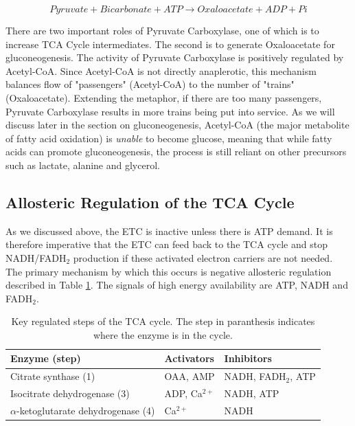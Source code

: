 \documentclass{tufte-handout}
\begin{document}
\begin{equation}\label{eq:pcx}
Pyruvate + Bicarbonate + ATP \rightarrow Oxaloacetate + ADP + Pi
\end{equation}

There are two important roles of Pyruvate Carboxylase, one of which is to increase TCA Cycle intermediates.  The second is to generate Oxaloacetate for gluconeogenesis.  The activity of Pyruvate Carboxylase is positively regulated by Acetyl-CoA.  Since Acetyl-CoA is not directly anaplerotic, this mechanism balances flow of "passengers" (Acetyl-CoA) to the number of "trains" (Oxaloacetate).  Extending the metaphor, if there are too many passengers, Pyruvate Carboxylase results in more trains being put into service.  As we will discuss later in the section on gluconeogenesis, Acetyl-CoA (the major metabolite of fatty acid oxidation) is \emph{unable} to become glucose, meaning that while fatty acids can promote gluconeogenesis, the process is still reliant on other precursors such as lactate, alanine and glycerol.

\subsection{Allosteric Regulation of the TCA Cycle}

As we discussed above, the ETC is inactive unless there is ATP demand.  It is therefore imperative that the ETC can feed back to the TCA cycle and stop NADH/FADH$_2$ production if these activated electron carriers are not needed.  The primary mechanism by which this occurs is negative allosteric regulation described in Table \ref{tab:tca-allosteric}.  The signals of high energy availability are ATP, NADH and FADH$_2$.

\begin{table}
\centering
\caption{Key regulated steps of the TCA cycle.  The step in paranthesis indicates where the enzyme is in the cycle.}
\label{tab:tca-allosteric}
\begin{tabular}{lll}
\hline
\textbf {Enzyme (step)} & \textbf{Activators} & \textbf{Inhibitors}\\
\hline
Citrate synthase (1) & OAA, AMP & NADH, FADH$_2$, ATP\\
Isocitrate dehydrogenase (3) & ADP, Ca$^{2+}$ &  NADH, ATP\\
$\alpha$-ketoglutarate dehydrogenase (4) & Ca$^{2+}$ &  NADH\\
\hline
\end{tabular}
\end{table}
\end{document}
